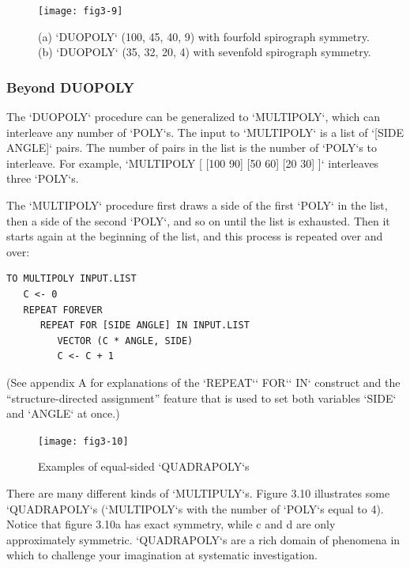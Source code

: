 \documentclass{book}
\begin{document}
\begin{figure}
\begin{center}
\texttt{[image: fig3-9]}
\caption{(a) \textsc{`DUOPOLY`} (100, 45, 40, 9) with fourfold spirograph symmetry. (b) \textsc{`DUOPOLY`} (35, 32, 20, 4) with sevenfold spirograph symmetry.}
\end{center}
\end{figure}

\subsubsection{Beyond DUOPOLY}

The \textsc{`DUOPOLY`} procedure can be generalized to \textsc{`MULTIPOLY`}, which can
interleave any number of \textsc{`POLY`}s. The input to \textsc{`MULTIPOLY`} is a list of
\textsc{`[SIDE ANGLE]`} pairs. The number of pairs in the list is the number of
\textsc{`POLY`}s to interleave. For example,
\textsc{`MULTIPOLY [ [100 90] [50 60] [20 30] ]`}
interleaves three \textsc{`POLY`}s.

The \textsc{`MULTIPOLY`} procedure first draws a side of the first \textsc{`POLY`} in the
list, then a side of the second \textsc{`POLY`}, and so on until the list is exhausted.
Then it starts again at the beginning of the list, and this process is
repeated over and over:

\begin{verbatim}
TO MULTIPOLY INPUT.LIST
   C <- 0
   REPEAT FOREVER
      REPEAT FOR [SIDE ANGLE] IN INPUT.LIST
         VECTOR (C * ANGLE, SIDE) 
         C <- C + 1
\end{verbatim}
(See appendix A for explanations of the \textsc{`REPEAT`}\textsc{` FOR`}\textsc{` IN`} construct and the ``structure-directed assignment'' feature that is used to
set both variables \textsc{`SIDE`} and \textsc{`ANGLE`} at once.)

\begin{figure}
\begin{center}
\texttt{[image: fig3-10]}
\caption{Examples of equal-sided \textsc{`QUADRAPOLY`}s}
\end{center}
\end{figure}

There are many different kinds of \textsc{`MULTIPULY`}s. Figure 3.10 illustrates
some \textsc{`QUADRAPOLY`}s (\textsc{`MULTIPOLY`}s with the number of \textsc{`POLY`}s equal to 4).
Notice that figure 3.10a has exact symmetry, while c and d are only approximately symmetric. \textsc{`QUADRAPOLY`}s are a rich domain of phenomena
in which to challenge your imagination at systematic investigation.
\end{document}
